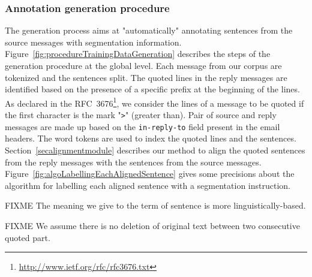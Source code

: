 \subsubsection{Annotation generation procedure}
\label{}

The generation process aims at "automatically" annotating sentences from the source messages with segmentation information.
Figure~\ref{fig:procedureTrainingDataGeneration} describes the steps of the generation procedure at the global level. 
Each message from our corpus are tokenized and the sentences split. 
The quoted lines in the reply messages are identified based on the presence of a specific prefix at the beginning of the lines. 
As declared in the RFC~3676\footnote{\url{http://www.ietf.org/rfc/rfc3676.txt}}, we consider the lines of a message to be quoted if the first character is the mark "\texttt{>}" (greater than).
%
Pair of source and reply messages are made up based on the \texttt{in-reply-to} field present in the email headers.
The word tokens are used to index the quoted lines and the sentences. 
Section~\ref{secalignmentmodule} describes our method to align the quoted sentences from the reply messages with the sentences from the source messages. 
Figure~\ref{fig:algoLabellingEachAlignedSentence} gives some precisions about the algorithm for labelling each aligned sentence with a segmentation instruction. 


FIXME The meaning we give to the term of sentence is more linguistically-based. 

FIXME We assume there is no deletion of original text between two consecutive quoted part.

